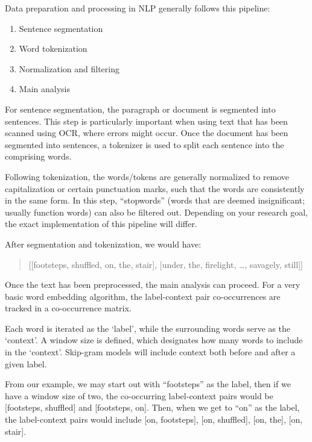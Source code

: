 Data preparation and processing in NLP generally follows this pipeline: 

\begin{enumerate}
\item Sentence segmentation
\item Word tokenization
\item Normalization and filtering
\item Main analysis
\end{enumerate}

For sentence segmentation, the paragraph or document is segmented into sentences. This step is particularly important when using text that has been scanned using OCR, where errors might occur.
Once the document has been segmented into sentences, a tokenizer is used to split each sentence into the comprising words. 

Following tokenization, the words/tokens are generally normalized to remove capitalization or certain punctuation marks, such that the words are consistently in the same form.
In this step, ``stopwords'' (words that are deemed insignificant; usually function words) can also be filtered out.
Depending on your research goal, the exact implementation of this pipeline will differ.


After segmentation and tokenization, we would have: 
\begin{quote}
[[footsteps, shuffled, on, the, stair], 
[under, the, firelight, \dots, savagely, still]]
\end{quote}

Once the text has been preprocessed, the main analysis can proceed. For a very basic word embedding algorithm, the label-context pair co-occurrences are tracked in a co-occurrence matrix.

Each word is iterated as the `label', while the surrounding words serve as the `context'. A window size is defined, which designates how many words to include in the `context'. Skip-gram models will include context both before and after a given label.

From our example, we may start out with ``footsteps'' as the label, then if we have a window size of two, the co-occurring label-context pairs would be [footsteps, shuffled] and [footsteps, on].
Then, when we get to ``on'' as the label, the label-context pairs would include [on, footsteps], [on, shuffled], [on, the], [on, stair].

